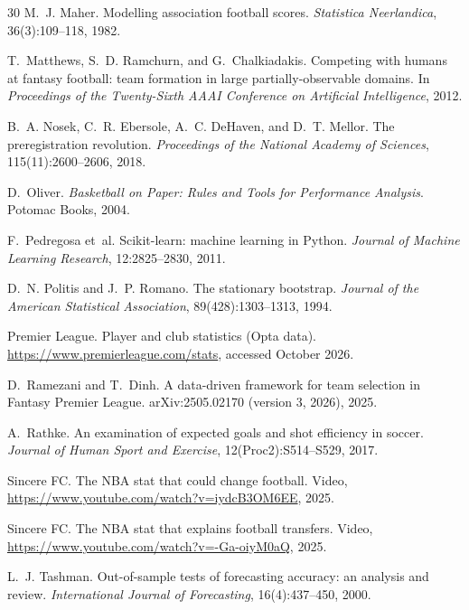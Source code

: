 \documentclass[11pt,a4paper]{article}
\begin{document}
\begin{thebibliography}{30}
M.~J. Maher.
\newblock Modelling association football scores.
\newblock \emph{Statistica Neerlandica}, 36(3):109--118, 1982.

T.~Matthews, S.~D. Ramchurn, and G.~Chalkiadakis.
\newblock Competing with humans at fantasy football: team formation in large partially-observable domains.
\newblock In \emph{Proceedings of the Twenty-Sixth AAAI Conference on Artificial Intelligence}, 2012.

B.~A. Nosek, C.~R. Ebersole, A.~C. DeHaven, and D.~T. Mellor.
\newblock The preregistration revolution.
\newblock \emph{Proceedings of the National Academy of Sciences}, 115(11):2600--2606, 2018.

D.~Oliver.
\newblock \emph{Basketball on Paper: Rules and Tools for Performance Analysis}.
\newblock Potomac Books, 2004.

F.~Pedregosa et~al.
\newblock Scikit-learn: machine learning in Python.
\newblock \emph{Journal of Machine Learning Research}, 12:2825--2830, 2011.

D.~N. Politis and J.~P. Romano.
\newblock The stationary bootstrap.
\newblock \emph{Journal of the American Statistical Association}, 89(428):1303--1313, 1994.

Premier League.
\newblock Player and club statistics (Opta data).
\newblock \url{https://www.premierleague.com/stats}, accessed October 2026.

D.~Ramezani and T.~Dinh.
\newblock A data-driven framework for team selection in Fantasy Premier League.
\newblock arXiv:2505.02170 (version 3, 2026), 2025.

A.~Rathke.
\newblock An examination of expected goals and shot efficiency in soccer.
\newblock \emph{Journal of Human Sport and Exercise}, 12(Proc2):S514--S529, 2017.

Sincere FC.
\newblock The NBA stat that could change football.
\newblock Video, \url{https://www.youtube.com/watch?v=iydcB3OM6EE}, 2025.

Sincere FC.
\newblock The NBA stat that explains football transfers.
\newblock Video, \url{https://www.youtube.com/watch?v=-Ga-oiyM0aQ}, 2025.

L.~J. Tashman.
\newblock Out-of-sample tests of forecasting accuracy: an analysis and review.
\newblock \emph{International Journal of Forecasting}, 16(4):437--450, 2000.

\end{thebibliography}
\end{document}
